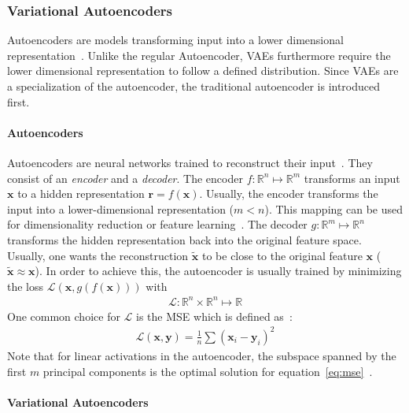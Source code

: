 \subsubsection{Variational Autoencoders}\label{subsec:variational-autoencoders}

Autoencoders are models transforming input into a lower dimensional representation~\citep[p. 146]{Goodfellow-et-al-2016}.
Unlike the regular Autoencoder, \acp{VAE} furthermore require the lower dimensional representation to follow a defined distribution.
Since \acfp{VAE} are a specialization of the autoencoder, the traditional autoencoder is introduced first.

\paragraph{Autoencoders}

Autoencoders are neural networks trained to reconstruct their input~\citep[p. 499]{Goodfellow-et-al-2016}.
They consist of an \textit{encoder} and a \textit{decoder}.
The encoder $f: \mathbb{R}^n \mapsto \mathbb{R}^m$ transforms an input $\bm{x}$ to a hidden representation $\bm{r} = f(\bm{x})$.
Usually, the encoder transforms the input into a lower-dimensional representation ($m < n$).
This mapping can be used for dimensionality reduction or feature learning~\citep[p. 499]{Goodfellow-et-al-2016}.
The decoder $g: \mathbb{R}^m \mapsto \mathbb{R}^n$ transforms the hidden representation back into the original feature space.
Usually, one wants the reconstruction $\tilde{\bm{x}}$ to be close to the original feature $\bm{x}$ ($\tilde{\bm{x}} \approx \bm{x}$).
In order to achieve this, the autoencoder is usually trained by minimizing the loss $\mathcal{L}(\bm{x}, g(f(\bm{x})))$ with
\begin{align}
    \mathcal{L}: \mathbb{R}^n \times \mathbb{R}^n \mapsto \mathbb{R}
\end{align}
One common choice for $\mathcal{L}$ is the \ac{MSE} which is defined as~\citep[p. 106]{Goodfellow-et-al-2016}:
\begin{align}
    \mathcal{L}(\bm{x}, \bm{y}) = \frac{1}{n}\sum (\bm{x}_i - \bm{y}_i)^2 \label{eq:mse}
\end{align}
Note that for linear activations in the autoencoder, the subspace spanned by the first $m$ principal components is the optimal solution for equation~\ref{eq:mse}~\citep{chicco2014deep}.

\paragraph{Variational Autoencoders}

